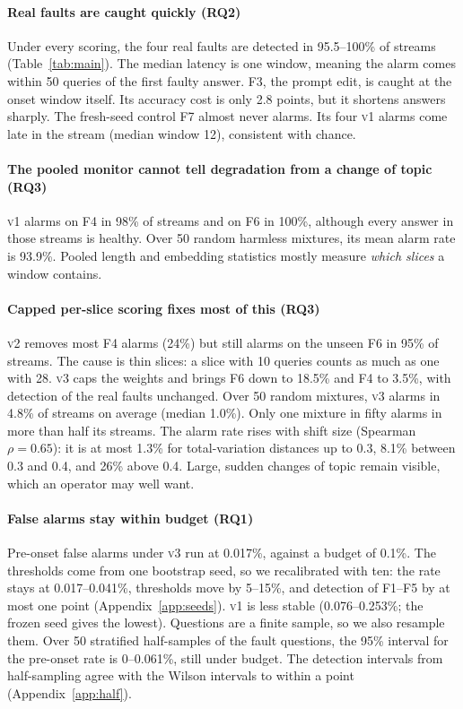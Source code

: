 \documentclass[11pt]{article}
\newcommand{\vone}{\textsc{v1}}
\newcommand{\vtwo}{\textsc{v2}}
\newcommand{\vthree}{\textsc{v3}}
\begin{document}
\paragraph{Real faults are caught quickly (RQ2)}
Under every scoring, the four real faults are detected in 95.5--100\% of streams
(Table~\ref{tab:main}). The median latency is one window, meaning the alarm comes
within 50 queries of the first faulty answer. F3, the prompt edit, is caught at
the onset window itself. Its accuracy cost is only 2.8 points, but it shortens
answers sharply. The fresh-seed control F7 almost never alarms. Its four \vone{}
alarms come late in the stream (median window 12), consistent with chance.

\paragraph{The pooled monitor cannot tell degradation from a change of topic (RQ3)}
\vone{} alarms on F4 in 98\% of streams and on F6 in 100\%, although every answer
in those streams is healthy. Over 50 random harmless mixtures, its mean alarm rate
is 93.9\%. Pooled length and embedding statistics mostly measure \emph{which
slices} a window contains.

\paragraph{Capped per-slice scoring fixes most of this (RQ3)}
\vtwo{} removes most F4 alarms (24\%) but still alarms on the unseen F6 in 95\% of
streams. The cause is thin slices: a slice with 10 queries counts as much as one
with 28. \vthree{} caps the weights and brings F6 down to 18.5\% and F4 to 3.5\%,
with detection of the real faults unchanged. Over 50 random mixtures, \vthree{}
alarms in 4.8\% of streams on average (median 1.0\%). Only one mixture in fifty
alarms in more than half its streams. The alarm rate rises with shift size
(Spearman $\rho=0.65$): it is at most 1.3\% for total-variation distances up to
0.3, 8.1\% between 0.3 and 0.4, and 26\% above 0.4. Large, sudden changes of topic remain visible, which an
operator may well want.

\paragraph{False alarms stay within budget (RQ1)}
Pre-onset false alarms under \vthree{} run at 0.017\%, against a budget of 0.1\%.
The thresholds come from one bootstrap seed, so we recalibrated with ten: the
rate stays at 0.017--0.041\%, thresholds move by 5--15\%, and detection of F1--F5
by at most one point (Appendix~\ref{app:seeds}). \vone{} is less stable
(0.076--0.253\%; the frozen seed gives the lowest).
Questions are a finite sample, so we also resample them. Over 50 stratified
half-samples of the fault questions, the 95\% interval for the pre-onset rate is
0--0.061\%, still under budget. The detection intervals from half-sampling agree
with the Wilson intervals to within a point (Appendix~\ref{app:half}).
\end{document}
